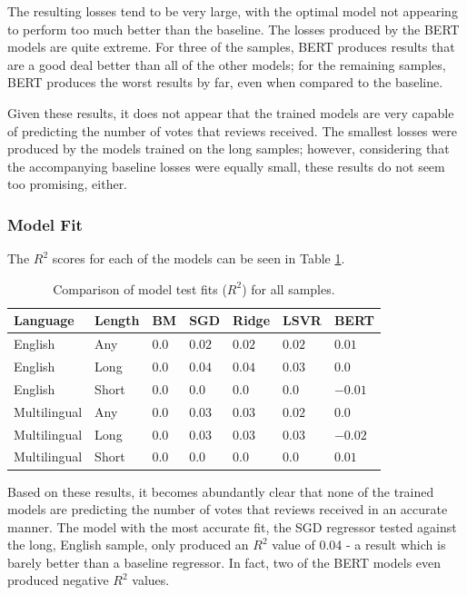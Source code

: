 The resulting losses tend to be very large, with the optimal model not appearing to perform too much better than the baseline. The losses produced by the BERT models are quite extreme. For three of the samples, BERT produces results that are a good deal better than all of the other models; for the remaining samples, BERT produces the worst results by far, even when compared to the baseline.

Given these results, it does not appear that the trained models are very capable of predicting the number of votes that reviews received. The smallest losses were produced by the models trained on the long samples; however, considering that the accompanying baseline losses were equally small, these results do not seem too promising, either.

\subsubsection{Model Fit}

The $R^2$ scores for each of the models can be seen in Table \ref{tab:Res_RF_Votes_CompFit}.

\begin{table}[ht]
    \centering
    \begin{tabular}{l l | l l l l l}
        \toprule
        \textbf{Language} & \textbf{Length} & \textbf{BM} & \textbf{SGD} & \textbf{Ridge} & \textbf{LSVR} & \textbf{BERT}\\\midrule
        English&Any&$0.0$&$\mathbf{0.02}$&$0.02$&$0.02$&$0.01$\\
        English&Long&$0.0$&$\mathbf{0.04}$&$0.04$&$0.03$&$0.0$\\
        English&Short&$\mathbf{0.0}$&$0.0$&$0.0$&$0.0$&$-0.01$\\\midrule
        Multilingual&Any&$0.0$&$0.03$&$\mathbf{0.03}$&$0.02$&$0.0$\\
        Multilingual&Long&$0.0$&$0.03$&$0.03$&$\mathbf{0.03}$&$-0.02$\\
        Multilingual&Short&$0.0$&$0.0$&$0.0$&$0.0$&$\mathbf{0.01}$\\
        \bottomrule
    \end{tabular}
    \caption{Comparison of model test fits ($R^2$) for all samples.}
    \label{tab:Res_RF_Votes_CompFit}
\end{table}

Based on these results, it becomes abundantly clear that none of the trained models are predicting the number of votes that reviews received in an accurate manner. The model with the most accurate fit, the SGD regressor tested against the long, English sample, only produced an $R^2$ value of 0.04 - a result which is barely better than a baseline regressor. In fact, two of the BERT models even produced negative $R^2$ values.

